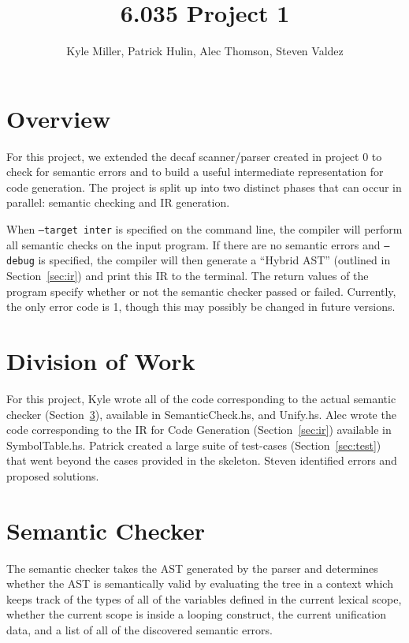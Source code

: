 \documentclass[11pt]{article}
\title{6.035 Project 1}
\author{Kyle Miller, Patrick Hulin, Alec Thomson, Steven Valdez}
\begin{document}
\maketitle

\section{Overview} 

For this project, we extended the decaf scanner/parser created in project 0 to 
check for semantic errors and to build a useful intermediate representation for 
code generation. The project is split up into two distinct phases that can 
occur in parallel: semantic checking and IR generation. 

When \texttt{--target inter} is specified on the command line, the compiler 
will perform all semantic checks on the input program. If there are no semantic 
errors and \texttt{--debug} is specified, the compiler will then generate a 
``Hybrid AST'' (outlined in Section~\ref{sec:ir}) and print this IR to the 
terminal. The return values of the program specify whether or not the semantic 
checker passed or failed. Currently, the only error code is 1, though this may 
possibly be changed in future versions.

\section{Division of Work} 

For this project, Kyle wrote all of the code corresponding to the
actual semantic checker (Section~\ref{sec:checker}), available in
SemanticCheck.hs, and Unify.hs. Alec wrote the code corresponding to
the IR for Code Generation (Section~\ref{sec:ir}) available in
SymbolTable.hs. Patrick created a large suite of test-cases
(Section~\ref{sec:test}) that went beyond the cases provided in the
skeleton. Steven identified errors and proposed solutions. 

\section{Semantic Checker}
\label{sec:checker}

The semantic checker takes the AST generated by the parser and
determines whether the AST is semantically valid by evaluating the
tree in a context which keeps track of the types of all of the
variables defined in the current lexical scope, whether the current
scope is inside a looping construct, the current unification data, and
a list of all of the discovered semantic errors.
\end{document}
